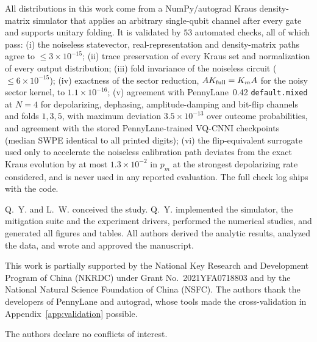 \documentclass[ASNA,twocolumn]{USG}
\begin{document}
All distributions in this work come from a NumPy/autograd Kraus
density-matrix simulator that applies an arbitrary single-qubit channel after
every gate and supports unitary folding.  It is validated by $53$ automated
checks, all of which pass:
(i) the noiseless statevector, real-representation and density-matrix paths
agree to $\le3\times10^{-15}$; (ii) trace preservation of every Kraus set and
normalization of every output distribution; (iii) fold invariance of the
noiseless circuit ($\le6\times10^{-15}$); (iv) exactness of the sector
reduction, $A K_{\rm full}=K_m A$ for the noisy sector kernel, to
$1.1\times10^{-16}$;
(v) agreement with PennyLane~0.42 \texttt{default.mixed} at $N=4$ for
depolarizing, dephasing, amplitude-damping and bit-flip channels and folds
$1,3,5$, with maximum deviation $3.5\times10^{-13}$ over outcome
probabilities, and agreement with the stored PennyLane-trained VQ-CNNI
checkpoints (median SWPE identical to all printed digits);
(vi) the flip-equivalent surrogate used only to accelerate the noiseless
calibration path deviates from the exact Kraus evolution by at most
$1.3\times10^{-2}$ in $p_m$ at the strongest depolarizing rate considered, and
is never used in any reported evaluation.  The full check log ships with the
code.

Q.~Y. and L.~W. conceived the study.
Q.~Y. implemented the simulator, the mitigation suite and the experiment
drivers, performed the numerical studies, and generated all figures and tables.
All authors derived the analytic results, analyzed the data, and wrote and
approved the manuscript.%

This work is partially supported by the National Key Research and Development
Program of China (NKRDC) under Grant No.~2021YFA0718803 and by the National
Natural Science Foundation of China (NSFC).  The authors thank the developers
of PennyLane and autograd, whose tools made the cross-validation in
Appendix~\ref{app:validation} possible.

The authors declare no conflicts of interest.
\end{document}
